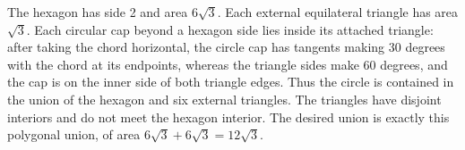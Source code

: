 The hexagon has side 2 and area $6\sqrt3$. Each external equilateral triangle has area $\sqrt3$. Each circular cap beyond a hexagon side lies inside its attached triangle: after taking the chord horizontal, the circle cap has tangents making 30 degrees with the chord at its endpoints, whereas the triangle sides make 60 degrees, and the cap is on the inner side of both triangle edges. Thus the circle is contained in the union of the hexagon and six external triangles. The triangles have disjoint interiors and do not meet the hexagon interior. The desired union is exactly this polygonal union, of area $6\sqrt3+6\sqrt3=\boxed{12\sqrt3}$.
